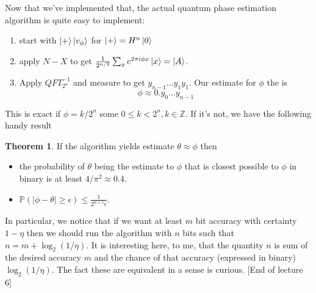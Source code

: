 \documentclass{article}
\theoremstyle{definition}
\newtheorem{theorem}{Theorem}
\begin{document}
Now that we've implemented that, the actual quantum phase estimation algorithm
is quite easy to implement:

\begin{enumerate}
\item start with $\ket{+}\ket{v_\phi}$ for $\ket{+} = H^n \ket{0}$
\item apply $N-X$ to get $\frac{1}{2^{n/2}} \sum_x e^{2\pi i \phi x} \ket{x} =
  \ket{A}$.
\item Apply $QFT^{-1}_{2^n}$ and measure to get $y_{n-1}\dots y_1y_1$. Our
  estimate for $\phi$ the is
$$ \phi \approx 0.y_0 \dots y_{n - 1} $$
\end{enumerate}
    
This is exact if $\phi = k / 2^n$ some $0 \leq k < 2^n, k \in \mathbb{Z}$. If
it's not, we have the following handy result

\begin{theorem}
  If the algorithm yields estimate $\theta \approx \phi$ then
\begin{itemize}
\item the probability of $\theta$ being the estimate to $\phi$ that is
  closest possible to $\phi$ in binary is at least $4 / \pi^2 \approx 0.4$.
\item $\mathbb{P}(|\phi - \theta| \geq \epsilon) \leq \frac{1}{2^{n +
      1}\epsilon}$.
\end{itemize}
\end{theorem}
    
In particular, we notice that if we want at least $m$ bit accuracy with
certainty $1 - \eta$ then we should run the algorithm with $n$ bits such that $n
= m + \log_2(1 / \eta)$. It is interesting here, to me, that the quantity $n$ is
sum of the desired accuracy $m$ and the chance of that accuracy (expressed in
binary) $\log_2(1/\eta)$. The fact these are equivalent in a sense is curious.
[End of lecture 6]
\end{document}

